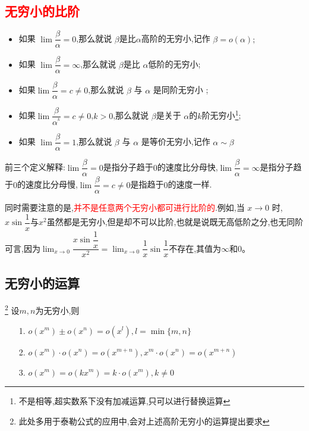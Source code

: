 \documentclass[9pt a4paper, oneside, UTF8]{ctexbook}
\begin{document}
\begin{sloppypar}
    \subsection{\textcolor{red}{无穷小的比阶}}
    \begin{defn}{}{}
        \begin{itemize}
            \item 如果 $\lim \dfrac{\beta}{\alpha} =0$,那么就说 $\beta$是比$\alpha$高阶的无穷小,记作 $\beta=o(\alpha);$
            \item  如果 $\lim \dfrac\beta\alpha  =\infty$,那么就说 $\beta$是比 $\alpha$低阶的无穷小;
            \item 如果$\lim\dfrac{\beta}{\alpha} =c\neq 0$,那么就说 $\beta$ 与 $\alpha$ 是同阶无穷小 ;
            \item 如果$\lim\dfrac{\beta}{\alpha^{^k}} =c \neq 0$,$k > 0$,那么就说 $\beta$是关于 $\alpha$的$k$阶无穷小\footnote{不是相等,超实数系下没有加减运算,只可以进行替换运算};
            \item 如果 $\lim \dfrac\beta\alpha = 1$,那么就说 $\beta$ 与 $\alpha$ 是等价无穷小,记作 $\alpha\sim\beta$
        \end{itemize}
    \end{defn}
    前三个定义解释:$\lim \dfrac{\beta}{\alpha} =0$是指分子趋于$0$的速度比分母快,$\lim \dfrac\beta\alpha  =\infty$是指分子趋于$0$的速度比分母慢,$\lim\dfrac{\beta}{\alpha} =c\neq 0$是指趋于$0$的速度一样.

    同时需要注意的是,\textcolor{red}{并不是任意两个无穷小都可进行比阶的}.例如,当 $x\to 0$ 时,$x\sin\dfrac1x$与$x^2$虽然都是无穷小,但是却不可以比阶,也就是说既无高低阶之分,也无同阶可言,因为$\lim_{x \to 0}\dfrac{x \sin \dfrac{1}{x}}{x^2}=\lim_{x\to0}\dfrac1x\sin\dfrac1x$不存在,其值为$\infty$和$0$。
    \subsection{无穷小的运算}\footnote{此处多用于泰勒公式的应用中,会对上述高阶无穷小的运算提出要求}
    设$m,n$为无穷小,则
    \begin{itemize}
        \item[1.] $o(x^{m})\pm o(x^{n})=o(x^{l}),l=\min\{m,n\}$
        \item[2.] $o(x^{m})\cdot o(x^{n})=o(x^{m+n}),x^{m}\cdot o(x^{n})=o(x^{m+n})$
        \item[3.] $o(x^{m})=o(kx^{m})=k\cdot o(x^{m}),k \neq 0$
    \end{itemize}

\end{sloppypar}
\end{document}
